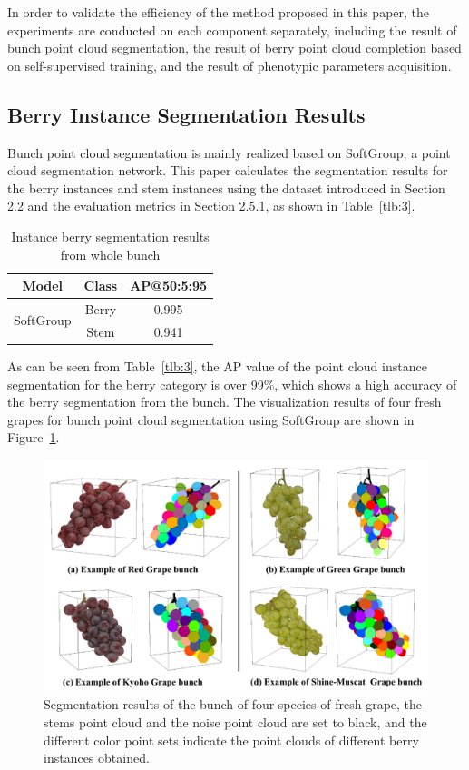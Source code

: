\documentclass[12pt]{article}
\begin{document}
In order to validate the efficiency of the method proposed in this paper, the experiments are conducted on each component separately, including the result of bunch point cloud segmentation, the result of berry point cloud completion based on self-supervised training, and the result of phenotypic parameters acquisition.

\subsection{Berry Instance Segmentation Results}

Bunch point cloud segmentation is mainly realized based on SoftGroup, a point cloud segmentation network. 
This paper calculates the segmentation results for the berry instances and stem instances using the dataset introduced in 
Section 2.2 and the evaluation metrics in Section 2.5.1, as shown in Table~\ref{tlb:3}.

\begin{table}[h]
    \centering
    \caption{Instance berry segmentation results from whole bunch}
    \begin{tabular}{ccc}
        \hline
        \textbf{Model} & \textbf{Class} & \textbf{AP@50:5:95} \\
        \hline
        \multirow{2}{*}{SoftGroup \citep{vu_softgroup_2022}} & Berry & 0.995 \\
        \cline{2-3}
        & Stem & 0.941 \\
        \hline
    \end{tabular}
\end{table}

As can be seen from Table~\ref{tlb:3}, the AP value of the point cloud instance segmentation for the berry category is over 99\%, which shows a high accuracy of the berry segmentation from the bunch. The visualization results of four fresh grapes for bunch point cloud segmentation using SoftGroup are shown in Figure~\ref{fig:raw13}.

\begin{figure}[hbt!]
    \centering
    \includegraphics[width=1\textwidth]{figures/Figure11.pdf}
    \caption{Segmentation results of the bunch of four species of fresh grape, the stems point cloud and the noise point cloud are set to black, and the different color point sets indicate the point clouds of different berry instances obtained.}
    \label{fig:raw13}
\end{figure}
\end{document}
